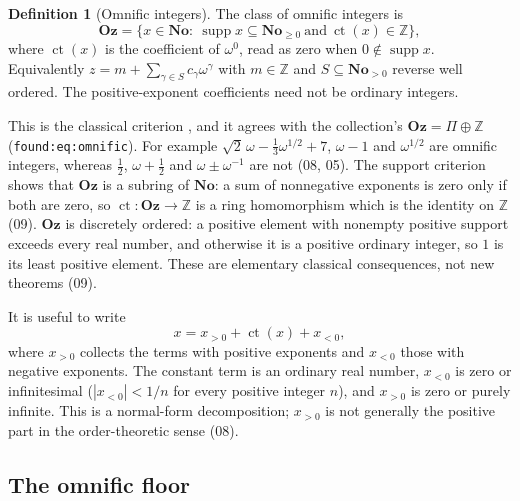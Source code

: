 \documentclass[11pt,oneside]{article}
\numberwithin{equation}{section}
\theoremstyle{definition}
\newtheorem{definition}[definition]{Definition}
\theoremstyle{remark}
\newcommand{\No}{\mathbf{No}}
\newcommand{\Oz}{\mathbf{Oz}}
\newcommand{\Z}{\mathbb Z}
\newcommand{\supp}{\operatorname{supp}}
\newcommand{\ct}{\operatorname{ct}}
\newcommand{\replabel}[1]{\nolinkurl{#1}}
\begin{document}
\begin{definition}[Omnific integers]\label{onot:def:oz}
The class of omnific integers is
\begin{equation}\label{onot:eq:oz}
 \Oz=\{x\in\No:\ \supp x\subseteq\No_{\ge0}\ \text{and}\ \ct(x)\in\Z\},
\end{equation}
where $\ct(x)$ is the coefficient of $\omega^0$, read as zero when $0\notin\supp
x$. Equivalently $z=m+\sum_{\gamma\in S}c_\gamma\omega^\gamma$ with $m\in\Z$ and
$S\subseteq\No_{>0}$ reverse well ordered. The positive-exponent coefficients
need not be ordinary integers.
\end{definition}

This is the classical criterion \cite{Conway,Gonshor,LM}, and it agrees with
the collection's $\Oz=\Pi\oplus\Z$ (\replabel{found:eq:omnific}). For
example $\sqrt2\,\omega-\tfrac13\omega^{1/2}+7$, $\omega-1$ and $\omega^{1/2}$
are omnific integers, whereas $\tfrac12$, $\omega+\tfrac12$ and
$\omega\pm\omega^{-1}$ are not (08, 05). The support criterion shows that $\Oz$
is a subring of $\No$: a sum of nonnegative exponents is zero only if both are
zero, so $\ct:\Oz\to\Z$ is a ring homomorphism which is the identity on $\Z$
(09). $\Oz$ is discretely ordered: a positive element with nonempty positive
support exceeds every real number, and otherwise it is a positive ordinary
integer, so $1$ is its least positive element. These are elementary classical
consequences, not new theorems (09).

It is useful to write
\begin{equation}\label{onot:eq:threeparts}
 x=x_{>0}+\ct(x)+x_{<0},
\end{equation}
where $x_{>0}$ collects the terms with positive exponents and $x_{<0}$ those with
negative exponents. The constant term is an ordinary real number, $x_{<0}$ is
zero or infinitesimal ($|x_{<0}|<1/n$ for every positive integer $n$), and
$x_{>0}$ is zero or purely infinite. This is a normal-form decomposition;
$x_{>0}$ is not generally the positive part in the order-theoretic sense (08).

\subsection{The omnific floor}\label{onot:sub:floor}
\end{document}

